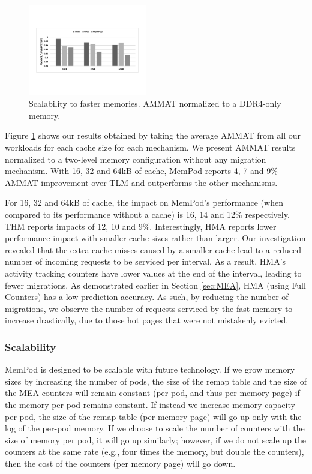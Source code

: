 \begin{figure}
  \includegraphics[width=0.46\textwidth]{figures/revised/new/cache_norm_tlm.pdf}
  \caption{Scalability to faster memories. AMMAT normalized to a DDR4-only memory.}
  \label{fig:cache_norm_tlm}
\end{figure}

Figure \ref{fig:cache_norm_tlm} shows our results obtained by taking the average AMMAT from all our workloads for each cache size for each mechanism. We present AMMAT results normalized to a two-level memory configuration without any migration mechanism. With 16, 32 and 64kB of cache, MemPod reports 4, 7 and 9\% AMMAT improvement over TLM and outperforms the other mechanisms.

For 16, 32 and 64kB of cache, the impact on MemPod's performance (when compared to its performance without a cache) is 16, 14 and 12\% respectively. THM reports impacts of 12, 10 and 9\%. Interestingly, HMA reports lower performance impact with smaller cache sizes rather than larger. Our investigation revealed that the extra cache misses caused by a smaller cache lead to a reduced number of incoming requests to be serviced per interval. As a result, HMA's activity tracking counters have lower values at the end of the interval, leading to fewer migrations. As demonstrated earlier in Section \ref{sec:MEA}, HMA (using Full Counters) has a low prediction accuracy. As such, by reducing the number of migrations, we observe the number of requests serviced by the fast memory to increase drastically, due to those hot pages that were not mistakenly evicted.

\subsubsection{Scalability}

MemPod is designed to be scalable with future technology.  If we grow memory
sizes by increasing the number of pods, the size of the remap table and the 
size of the MEA counters will remain constant (per pod, and thus per memory
page) if the memory per pod remains constant.  If instead we increase
memory capacity per pod, the size of the remap table (per memory page)
will go up only with the log of the per-pod memory. If we choose to scale
the number of counters with the size of memory per pod, it will go up
similarly; however, if we do not scale up the counters at the same rate
(e.g., four times the memory, but double the counters), then the cost
of the counters (per memory page) will go down.

